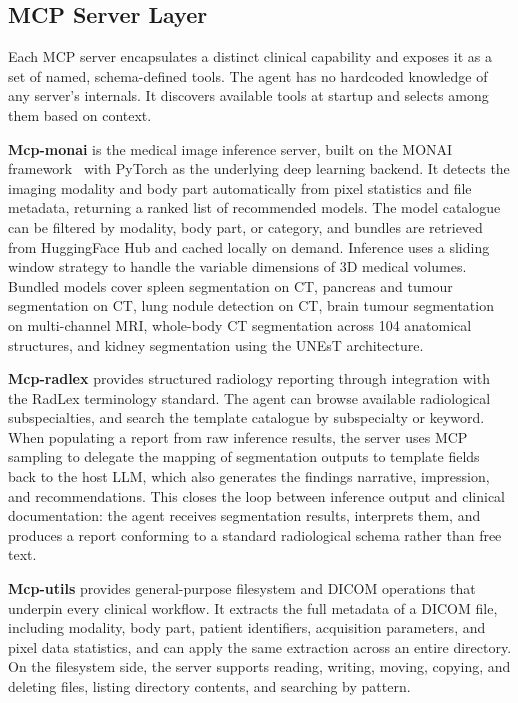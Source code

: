 \documentclass[conference]{IEEEtran}
\begin{document}
\subsection{MCP Server Layer}

Each MCP server encapsulates a distinct clinical capability and exposes
it as a set of named, schema-defined tools. The agent has no hardcoded
knowledge of any server's internals. It discovers available tools at
startup and selects among them based on context.

\textbf{Mcp-monai} is the medical image inference server, built on the
MONAI framework~\cite{monai} with PyTorch as the underlying deep
learning backend. It detects the imaging modality and body part
automatically from pixel statistics and file metadata, returning a
ranked list of recommended models. The model catalogue can be filtered
by modality, body part, or category, and bundles are retrieved from
HuggingFace Hub and cached locally on demand. Inference uses a sliding
window strategy to handle the variable dimensions of 3D medical volumes. Bundled models cover spleen segmentation on CT, pancreas and
tumour segmentation on CT, lung nodule detection on CT, brain tumour
segmentation on multi-channel MRI, whole-body CT segmentation across
104 anatomical structures, and kidney segmentation using the UNEsT
architecture.

\textbf{Mcp-radlex} provides structured radiology reporting through
integration with the RadLex terminology standard.
The agent can browse
available radiological subspecialties, and search the template catalogue by
subspecialty or keyword. When populating a report from raw inference
results, the server uses MCP sampling to delegate the mapping of
segmentation outputs to template fields back to the host LLM, which
also generates the findings narrative, impression, and recommendations.
This closes the loop between inference output and clinical
documentation: the agent receives segmentation results, interprets
them, and produces a report conforming to a standard radiological
schema rather than free text.

\textbf{Mcp-utils} provides general-purpose filesystem and DICOM
operations that underpin every clinical workflow. It extracts the full
metadata of a DICOM file, including modality, body part, patient
identifiers, acquisition parameters, and pixel data statistics, and can
apply the same extraction across an entire directory. On the filesystem side, the
server supports reading, writing, moving, copying, and deleting files,
listing directory contents, and searching by pattern.
\end{document}
